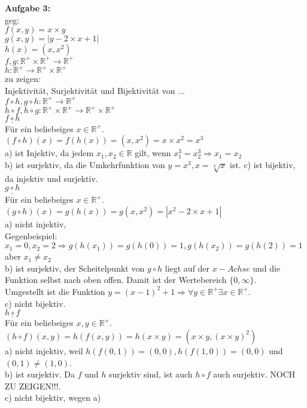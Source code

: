\documentclass[a4paper]{scrartcl}
\begin{document}
	\begin{flushleft}
		\textbf{Aufgabe 3:}\\
		geg:\\
		$f(x,y) = x\times y$\\
		$g(x,y) = |y-2\times x + 1|$\\
		$h(x)=(x,x^2)$\\
		$f,g: \mathbb{R^+}\times \mathbb{R^+}\rightarrow \mathbb{R^+}$\\
		$h: \mathbb{R^+}\rightarrow\mathbb{R^+}\times \mathbb{R^+}$\\[1em]
		zu zeigen:\\
		Injektivität, Surjektivität und Bijektivität von ...\\
		$f\circ h, g\circ h:\mathbb{R^+}\rightarrow\mathbb{R^+}$	\\
		$h\circ f, h\circ g:\mathbb{R^+}\times\mathbb{R^+}\rightarrow\mathbb{R^+}\times\mathbb{R^+}$\\[1em]
		$\underline{f\circ h}$\\
		Für ein beliebeiges $x\in\mathbb{R^+}$.\\
		$(f\circ h)(x)=f(h(x))=(x,x^2)=x\times x^2=x^3$\\
		a) ist Injektiv, da jedem $x_1,x_2\in \mathbb{R}$ gilt, wenn  $x_1^3=x_2^3 \Rightarrow x_1 = x_2$\\
		b) ist surjektiv,  da die Umkehrfunktion von $y=x^3,x=\sqrt[3]{x}$ ist.
		c) ist bijektiv, da injektiv und surjektiv.\\[1em]

		$\underline{g\circ h}$\\
		Für ein beliebeiges $x\in\mathbb{R^+}$.\\
		$(g\circ h)(x)=g(h(x))=g(x,x^2)=|x^2-2\times x+1|$\\
		a) nicht injektiv,\\
		Gegenbeispiel: $x_1=0,x_2=2\Rightarrow g(h(x_1))=g(h(0))=1, g(h(x_2))= g(h(2))=1$ aber $x_1\neq x_2$\\
		b) ist surjektiv, der Scheitelpunkt von $g\circ h$ liegt auf der $x-Achse$ und die Funktion selbst nach oben offen. Damit ist der Wertebereich $\{0,\infty\}$.\\
		Umgestellt ist die Funktion $y=(x-1)^2+1\Rightarrow \forall y\in\mathbb{R^+}\exists x\in\mathbb{R^+}$.\\
		c) nicht bijektiv.\\[1em]

		$\underline{h\circ f}$\\
		Für ein beliebeiges $x,y\in\mathbb{R^+}$.\\
		$(h\circ f)(x,y)=h(f(x,y))=h(x\times y)=(x\times y,(x\times y)^2)$\\
		a) nicht injektiv, weil $h(f(0,1))=(0,0), h(f(1,0))=(0,0)$ und $(0,1)\neq(1,0)$.\\
		b) ist surjektiv. Da $f$ und $h$ surjektiv sind, ist auch $h\circ f$ auch surjektiv. NOCH ZU ZEIGEN!!!.\\
		c) nicht bijektiv, wegen a)\\[1em]


\end{flushleft}
\end{document}
